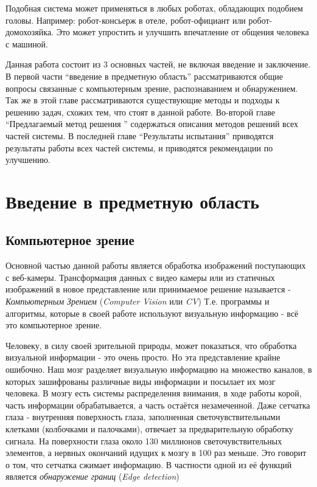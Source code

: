 \documentclass[12pt]{report}
\begin{document}


Подобная система может применяться в любых роботах, обладающих подобием головы.
Например: робот-консьерж в отеле, робот-официант или робот-домохозяйка. Это может упростить и улучшить
впечатление от общения человека с машиной.

Данная работа состоит из 3 основных частей, не включая введение и заключение. В первой части ``введение в предметную область'' рассматриваются общие вопросы связанные с компьютерным зрение, распознаванием и обнаружением. Так же в этой главе рассматриваются существующие методы и подходы к решению задач, схожих тем, что стоят в данной работе. Во-второй главе ``Предлагаемый метод решения '' содержаться описания методов решений всех частей системы. В последней главе ``Результаты испытания'' приводятся результаты работы всех частей системы, и приводятся рекомендации по улучшению.

\chapter{Введение в предметную область}
\thispagestyle{fancy}

\section{Компьютерное зрение}

Основной частью данной работы является обработка изображений поступающих с веб-камеры. Трансформация данных с видео 
камеры или из статичных изображений в новое представление или принимаемое решение называется - \emph{Компьютерным 
Зрением} (\textit{Computer Vision} или \textit{CV})\citep{bradski2008learning} Т.е. программы и алгоритмы, которые в 
своей работе используют визуальную информацию - всё это компьютерное зрение.

Человеку, в силу своей зрительной природы, может показаться, что обработка визуальной информации - это очень просто. 
Но эта представление крайне ошибочно. Наш мозг разделяет визуальную информацию на множество каналов, в которых 
зашифрованы различные виды информации и посылает их мозг человека. В мозгу есть системы распределения внимания, в 
ходе работы корой, часть информации обрабатывается, а часть остаётся незамеченной. \citep{bradski2008learning} Даже 
сетчатка глаза - внутренняя поверхность глаза, заполненная светочувствительными клетками (колбочками и палочками), 
отвечает за предварительную обработку сигнала. На поверхности глаза около 130 миллионов светочувствительных 
элементов, а нервных окончаний идущих к мозгу в 100 раз меньше. Это говорит о том, что сетчатка сжимает информацию. В 
частности одной из её функций является \emph{обнаружение границ} (\textit{Edge detection}) \citep{RetinaOnWiki}
\end{document}
